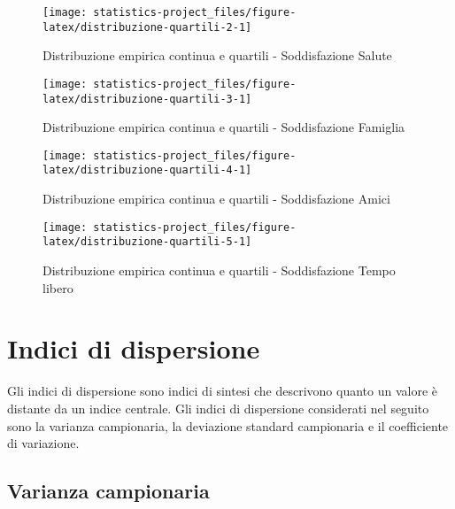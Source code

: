 \documentclass[]{book}
\begin{document}
\begin{figure}

{\centering \texttt{[image: statistics-project\_files/figure-latex/distribuzione-quartili-2-1]} 

}

\caption{Distribuzione empirica continua e quartili - Soddisfazione Salute}\label{fig:distribuzione-quartili-2}
\end{figure}

\begin{figure}

{\centering \texttt{[image: statistics-project\_files/figure-latex/distribuzione-quartili-3-1]} 

}

\caption{Distribuzione empirica continua e quartili - Soddisfazione Famiglia}\label{fig:distribuzione-quartili-3}
\end{figure}

\begin{figure}

{\centering \texttt{[image: statistics-project\_files/figure-latex/distribuzione-quartili-4-1]} 

}

\caption{Distribuzione empirica continua e quartili - Soddisfazione Amici}\label{fig:distribuzione-quartili-4}
\end{figure}

\begin{figure}

{\centering \texttt{[image: statistics-project\_files/figure-latex/distribuzione-quartili-5-1]} 

}

\caption{Distribuzione empirica continua e quartili - Soddisfazione Tempo libero}\label{fig:distribuzione-quartili-5}
\end{figure}

\chapter{Indici di dispersione}\label{indici-di-dispersione}

Gli indici di dispersione sono indici di sintesi che descrivono quanto
un valore è distante da un indice centrale. Gli indici di dispersione
considerati nel seguito sono la varianza campionaria, la deviazione
standard campionaria e il coefficiente di variazione.

\section{Varianza campionaria}\label{varianza-campionaria}
\end{document}
